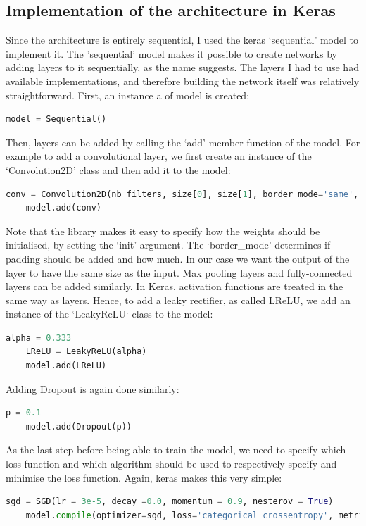 \documentclass[12pt,a4paper,twoside,openright]{report}
\begin{document}
\subsection{Implementation of the architecture in Keras}
Since the architecture is entirely sequential, I used the keras `sequential' model to implement it. The 'sequential' model makes it possible to create networks by adding layers to it sequentially, as the name suggests. The layers I had to use had available implementations, and therefore building the network itself was relatively straightforward. First, an instance a of model is created:
\begin{lstlisting}[language=Python]
	model = Sequential()
\end{lstlisting}
Then, layers can be added by calling the `add' member function of the model. For example to add a convolutional layer, we first create an instance of the `Convolution2D' class and then add it to the model:
\begin{lstlisting}[language=Python]
	conv = Convolution2D(nb_filters, size[0], size[1], border_mode='same', init='glorot_normal')
	model.add(conv)
\end{lstlisting}
Note that the library makes it easy to specify how the weights should be initialised, by setting the `init' argument. The `border\_mode' determines if padding should be added and how much. In our case we want the output of the layer to have the same size as the input. Max pooling layers and fully-connected layers can be added similarly.
In Keras, activation functions are treated in the same way as layers. Hence, to add a leaky rectifier, as called LReLU, we add an instance of the `LeakyReLU` class to the model:
\begin{lstlisting}[language=Python]
	alpha = 0.333
	LReLU = LeakyReLU(alpha)
	model.add(LReLU)
\end{lstlisting}
Adding Dropout is again done similarly:
\begin{lstlisting}[language=Python]
	p = 0.1
	model.add(Dropout(p))
\end{lstlisting}
As the last step before being able to train the model, we need to specify which loss function and which algorithm should be used to respectively specify and minimise the loss function. Again, keras makes this very simple:
\begin{lstlisting}[language=Python]
	sgd = SGD(lr = 3e-5, decay =0.0, momentum = 0.9, nesterov = True)
	model.compile(optimizer=sgd, loss='categorical_crossentropy', metrics=['accuracy']
\end{lstlisting}
\end{document}
